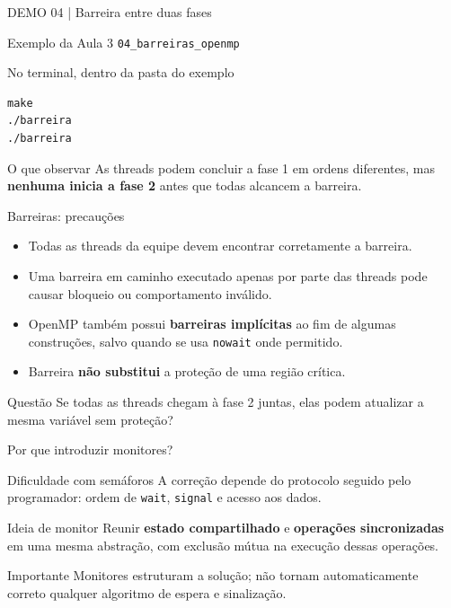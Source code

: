 \documentclass[aspectratio=169,11pt]{beamer}
\begin{document}
\begin{frame}[fragile]{DEMO 04 | Barreira entre duas fases}
\small
\begin{block}{Exemplo da Aula 3}
\texttt{04\_barreiras\_openmp}
\end{block}
\begin{block}{No terminal, dentro da pasta do exemplo}
\begin{verbatim}
make
./barreira
./barreira
\end{verbatim}
\end{block}
\begin{exampleblock}{O que observar}
As threads podem concluir a fase 1 em ordens diferentes, mas \textbf{nenhuma inicia a fase 2} antes que todas alcancem a barreira.
\end{exampleblock}
\end{frame}

\begin{frame}{Barreiras: precauções}
\small
\begin{itemize}
\item Todas as threads da equipe devem encontrar corretamente a barreira.
\item Uma barreira em caminho executado apenas por parte das threads pode causar bloqueio ou comportamento inválido.
\item OpenMP também possui \textbf{barreiras implícitas} ao fim de algumas construções, salvo quando se usa \texttt{nowait} onde permitido.
\item Barreira \textbf{não substitui} a proteção de uma região crítica.
\end{itemize}
\begin{alertblock}{Questão}
Se todas as threads chegam à fase 2 juntas, elas podem atualizar a mesma variável sem proteção?
\end{alertblock}
\end{frame}

\begin{frame}{Por que introduzir monitores?}
\small
\begin{block}{Dificuldade com semáforos}
A correção depende do protocolo seguido pelo programador: ordem de \texttt{wait}, \texttt{signal} e acesso aos dados.
\end{block}
\begin{block}{Ideia de monitor}
Reunir \textbf{estado compartilhado} e \textbf{operações sincronizadas} em uma mesma abstração, com exclusão mútua na execução dessas operações.
\end{block}
\begin{alertblock}{Importante}
Monitores estruturam a solução; não tornam automaticamente correto qualquer algoritmo de espera e sinalização.
\end{alertblock}
\end{frame}
\end{document}
